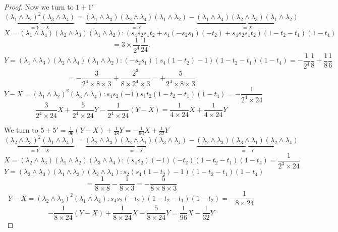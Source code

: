 \documentclass[11pt]{amsart}
\theoremstyle{definition}
\theoremstyle{remark}
\numberwithin{equation}{section}
\begin{document}
\begin{proof}
Now we turn to $\boxed{1}+\boxed{1'}$
$$
\underbrace{\left(\lambda_1 \wedge \lambda_2\right)^2\left(\lambda_3 \wedge \lambda_4\right)}_{=Y-X}=\underbrace{\left(\lambda_1 \wedge \lambda_3\right)\left(\lambda_2 \wedge \lambda_4\right)\left(\lambda_1 \wedge \lambda_2\right)}_{=Y}-\underbrace{\left(\lambda_1 \wedge \lambda_4\right)\left(\lambda_2 \wedge \lambda_3\right)\left(\lambda_1 \wedge \lambda_2\right)}_{=X}
$$
$$
X=\left(\lambda_1 \wedge \lambda_4\right)\left(\lambda_2 \wedge \lambda_3\right)\left(\lambda_1 \wedge \lambda_2\right): (s_4s_2s_1t_2+s_4(-s_2s_1)(-t_2)+s_4s_2s_1t_2)(1-t_2-t_1)(1-t_4)
$$
$$
=3\times \frac{1}{2^4}\frac{1}{24}.
$$
$$
Y=\left(\lambda_1 \wedge \lambda_3\right)\left(\lambda_2 \wedge \lambda_4\right)\left(\lambda_1 \wedge \lambda_2\right):(-s_2s_1)(s_4(1-t_2)-1)(1-t_2-t_1)(1-t_4)=-\frac{1}{2^4}\frac{1}{8}+\frac{1}{8}\frac{1}{6}
$$
$$
=-\frac{3}{2^4\times 8\times 3}+\frac{2^3}{8\times 2^4\times 3}=+\frac{5}{2^4\times 8\times 3}
$$
$$
Y-X=\left(\lambda_1 \wedge \lambda_2\right)^2\left(\lambda_3 \wedge \lambda_4\right):s_4s_2(-1)s_1t_2(1-t_2-t_1)(1-t_4)=-\frac{1}{2^4\times 24}
$$
$$
\frac{3}{2^4\times 24}X+\frac{5}{2^4\times 24}Y-\frac{1}{2^4\times 24}(Y-X)=\frac{1}{4\times 24}X+\frac{1}{4\times 24}Y
$$

We turn to $\boxed{5}+\boxed{5'}=\frac{1}{96}(Y-X)+\frac{1}{48}Y=-\frac{1}{96}X+\frac{1}{32}Y$
$$
\underbrace{\left(\lambda_2 \wedge \lambda_3\right)^2\left(\lambda_1 \wedge \lambda_4\right)}_{=Y-X}=\underbrace{\left(\lambda_2 \wedge \lambda_3\right)\left(\lambda_2 \wedge \lambda_1\right)\left(\lambda_3 \wedge \lambda_4\right)}_{=-X}-\underbrace{\left(\lambda_2 \wedge \lambda_3\right)\left(\lambda_3 \wedge \lambda_1\right)\left(\lambda_2 \wedge \lambda_4\right)}_{=-Y}
$$
$$
X=\left(\lambda_2 \wedge \lambda_3\right)\left(\lambda_1 \wedge \lambda_2\right)\left(\lambda_3 \wedge \lambda_4\right):(s_4s_2)(-1)(-t_2)(1-t_2-t_1)(1-t_4)=\frac{1}{2^3\times 24}
$$
$$
Y=\left(\lambda_2 \wedge \lambda_3\right)\left(\lambda_1 \wedge \lambda_3\right)\left(\lambda_2 \wedge \lambda_4\right):s_2(s_4(1-t_2)-1)(1-t_2-t_1)(1-t_4)
$$
$$
=\frac{1}{8\times 8}-\frac{1}{8\times 3}=-\frac{5}{8\times 8\times 3}
$$
$$
Y-X=\left(\lambda_2 \wedge \lambda_3\right)^2\left(\lambda_1 \wedge \lambda_4\right):s_4s_2(-t_2)(1-t_2-t_1)(1-t_2)=-\frac{1}{8\times 24}
$$
$$
-\frac{1}{8\times 24}(Y-X)+\frac{1}{8\times 24}X-\frac{5}{8\times 24}Y=\frac{1}{96}X-\frac{1}{32}Y
$$



\end{proof}
\end{document}
